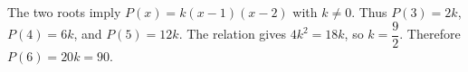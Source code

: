 The two roots imply $P(x)=k(x-1)(x-2)$ with $k\ne0$. Thus $P(3)=2k$, $P(4)=6k$, and $P(5)=12k$. The relation gives $4k^2=18k$, so $k=\dfrac{9}{2}$. Therefore $P(6)=20k=\boxed{90}$.
